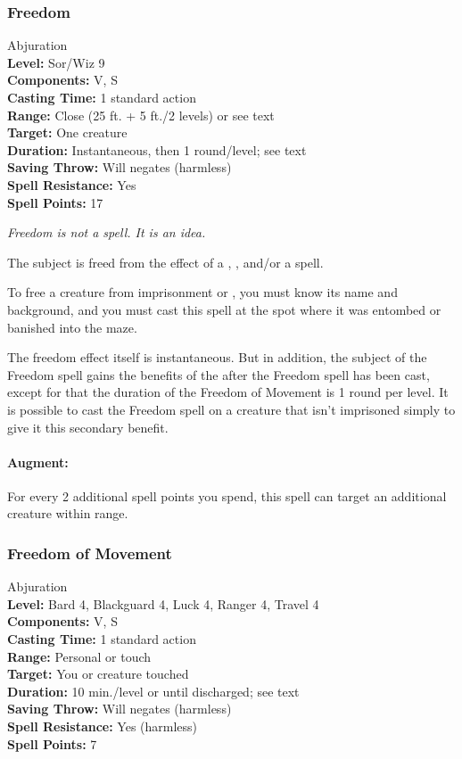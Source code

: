 \subsubsection{Freedom}
\label{Spell:Freedom}
Abjuration
\\ \textbf{Level:} Sor/Wiz 9
\\ \textbf{Components:} V, S
\\ \textbf{Casting Time:} 1 standard action
\\ \textbf{Range:} Close (25 ft. + 5 ft./2 levels) or see text
\\ \textbf{Target:} One creature
\\ \textbf{Duration:} Instantaneous, then 1 round/level; see text
\\ \textbf{Saving Throw:} Will negates (harmless)
\\ \textbf{Spell Resistance:} Yes
\\ \textbf{Spell Points:} 17

\emph{Freedom is not a spell. It is an idea.}

The subject is freed from the effect of a , ,  and/or a  spell.

To free a creature from imprisonment or , 
you must know its name and background, and you must cast this spell at the spot where it was entombed or banished into the maze.

The freedom effect itself is instantaneous. 
But in addition, the subject of the Freedom spell gains the benefits of the  after the Freedom spell has been cast,
except for that the duration of the Freedom of Movement is 1 round per level.
It is possible to cast the Freedom spell on a creature that isn't imprisoned simply to give it this secondary benefit.

\paragraph{Augment:} For every 2 additional spell points you spend, this spell can target an additional creature within range.
\subsubsection{Freedom of Movement}
\label{Spell:FreedomOfMovement}
Abjuration
\\ \textbf{Level:} Bard 4, Blackguard 4, Luck 4, Ranger 4, Travel 4
\\ \textbf{Components:} V, S
\\ \textbf{Casting Time:} 1 standard action
\\ \textbf{Range:} Personal or touch
\\ \textbf{Target:} You or creature touched
\\ \textbf{Duration:} 10 min./level or until discharged; see text
\\ \textbf{Saving Throw:} Will negates (harmless)
\\ \textbf{Spell Resistance:} Yes (harmless)
\\ \textbf{Spell Points:} 7


